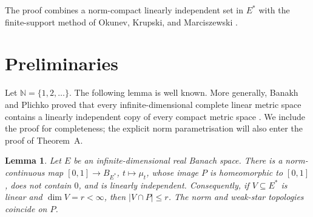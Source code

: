 \documentclass[a4paper]{amsart}
\newtheorem{lemma}[theorem]{Lemma}
\newcommand{\N}{\mathbb{N}}
\newcommand{\abs}[1]{\lvert #1\rvert}
\begin{document}
The proof combines a norm-compact linearly independent set in $E^*$ with
the finite-support method of Okunev, Krupski, and Marciszewski
\cite{Okunev2011,Krupski2013,Krupski2016,KrupskiMarciszewski2017}.

\section{Preliminaries}
\label{sec:preliminaries}

Let $\N=\{1,2,\ldots\}$.  The following lemma is well known.  More
generally, Banakh and Plichko proved that every infinite-dimensional
complete linear metric space contains a linearly independent copy of
every compact metric space \cite[Corollary~1]{BanakhPlichko2006}.  We
include the proof for completeness; the explicit norm parametrisation
will also enter the proof of Theorem~A.

\begin{lemma}\label{lem:arc}
Let $E$ be an infinite-dimensional real Banach space.  There is a
norm-continuous map $[0,1]\to B_{E^*}$, $t\mapsto\mu_t$,
whose image $P$ is homeomorphic to $[0,1]$, does not contain $0$, and is
linearly independent.  Consequently, if $V\subseteq E^*$ is
linear and $\dim V=r<\infty$, then $\abs{V\cap P}\leqslant r$.  The norm
and weak-star topologies coincide on $P$.
\end{lemma}
\end{document}
